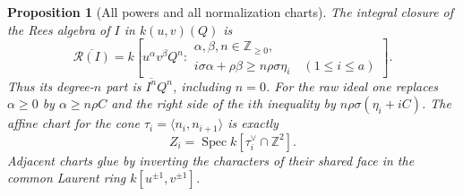 \documentclass[11pt,reqno]{amsart}
\numberwithin{equation}{section}
\newtheorem{proposition}[theorem]{Proposition}
\theoremstyle{definition}\newtheorem{definition}[theorem]{Definition}
\theoremstyle{remark}\newtheorem{remark}[theorem]{Remark}
\DeclareMathOperator{\Spec}{Spec}\DeclareMathOperator{\PGL}{PGL}
\begin{document}
\begin{proposition}[All powers and all normalization charts]
\label{prop:ramified-rees-v170}
The integral closure of the Rees algebra of $I$ in $k(u,v)(Q)$ is
\begin{equation}\label{eq:ramified-rees-v170}
 \overline{\mathcal R(I)}
 =k\left[u^\alpha v^\beta Q^n:
 \begin{array}{l}
 \alpha,\beta,n\in\mathbb Z_{\geq0},\\
 i\sigma\alpha+\rho\beta\geq n\rho\sigma\eta_i
                  \quad(1\leq i\leq a)
 \end{array}\right].
\end{equation}
Thus its degree-$n$ part is $\overline{I^n}Q^n$, including $n=0$.
For the raw ideal one replaces $\alpha\geq0$ by
$\alpha\geq n\rho C$ and the right side of the $i$th inequality by
$n\rho\sigma(\eta_i+iC)$. The affine chart for the cone
$\tau_i=\langle n_i,n_{i+1}\rangle$ is exactly
\begin{equation}\label{eq:normal-chart-v170}
 Z_i=\Spec k[\tau_i^\vee\cap\mathbb Z^2].
\end{equation}
Adjacent charts glue by inverting the characters of their shared
face in the common Laurent ring $k[u^{\pm1},v^{\pm1}]$.
\end{proposition}
\end{document}
